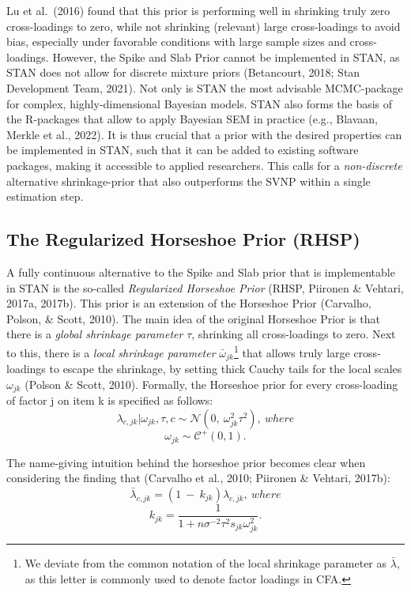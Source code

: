 \documentclass[
  man, donotrepeattitle,floatsintext]{apa6}
\begin{document}
Lu et al.~(2016) found that this prior is performing well in shrinking truly zero cross-loadings to zero, while not shrinking (relevant) large cross-loadings to avoid bias, especially under favorable conditions with large sample sizes and cross-loadings. However, the Spike and Slab Prior cannot be implemented in STAN, as STAN does not allow for discrete mixture priors (Betancourt, 2018; Stan Development Team, 2021). Not only is STAN the most advisable MCMC-package for complex, highly-dimensional Bayesian models. STAN also forms the basis of the R-packages that allow to apply Bayesian SEM in practice (e.g., Blavaan, Merkle et al., 2022). It is thus crucial that a prior with the desired properties can be implemented in STAN, such that it can be added to existing software packages, making it accessible to applied researchers. This calls for a \emph{non-discrete} alternative shrinkage-prior that also outperforms the SVNP within a single estimation step.

\hypertarget{the-regularized-horseshoe-prior-rhsp}{%
\subsection{The Regularized Horseshoe Prior (RHSP)}\label{the-regularized-horseshoe-prior-rhsp}}

A fully continuous alternative to the Spike and Slab prior that is implementable in STAN is the so-called \emph{Regularized Horseshoe Prior} (RHSP, Piironen \& Vehtari, 2017a, 2017b). This prior is an extension of the Horseshoe Prior (Carvalho, Polson, \& Scott, 2010). The main idea of the original Horseshoe Prior is that there is a \emph{global shrinkage parameter} \(\tau\), shrinking all cross-loadings to zero. Next to this, there is a \emph{local shrinkage parameter} \(\bar{\omega}_{jk}\)\footnote{We deviate from the common notation of the local shrinkage parameter as \(\bar{\lambda}\), as this letter is commonly used to denote factor loadings in CFA.} that allows truly large cross-loadings to escape the shrinkage, by setting thick Cauchy tails for the local scales \(\omega_{jk}\) (Polson \& Scott, 2010). Formally, the Horseshoe prior for every cross-loading of factor j on item k is specified as follows:
\[\lambda_{c,jk} | \omega_{jk}, \tau, c\sim \mathcal{N}(0, \ \omega^2_{jk} \tau^2), \ where\]
\[\omega_{jk} \sim \mathcal{C^+}(0, 1).\]

The name-giving intuition behind the horseshoe prior becomes clear when considering the finding that (Carvalho et al., 2010; Piironen \& Vehtari, 2017b):
\[\bar{\lambda}_{c,jk} = (1 \ - \ k_{jk}) \hat{\lambda}_{c,jk}, \ where\]
\[k_{jk} = \frac{1}{1 + n \sigma^{-2}\tau^2s_{jk}\omega^2_{jk}}.\]
\end{document}
